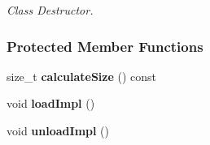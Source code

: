 \begin{DoxyCompactItemize}
\begin{DoxyCompactList}\small\item\em Class Destructor. \item\end{DoxyCompactList}\end{DoxyCompactItemize}
\subsubsection*{Protected Member Functions}
\begin{DoxyCompactItemize}
\item 
\hypertarget{classphys_1_1internal_1_1BulletFile_a6567c5755bfb2fa29f4f4c88ee3240d0}{
size\_\-t {\bfseries calculateSize} () const }
\label{classphys_1_1internal_1_1BulletFile_a6567c5755bfb2fa29f4f4c88ee3240d0}

\item 
\hypertarget{classphys_1_1internal_1_1BulletFile_ab0568f82e14f6e35e1c9c236ec569fdf}{
void {\bfseries loadImpl} ()}
\label{classphys_1_1internal_1_1BulletFile_ab0568f82e14f6e35e1c9c236ec569fdf}

\item 
\hypertarget{classphys_1_1internal_1_1BulletFile_a3baf3dfd3bba2f3ed88cccae00b74596}{
void {\bfseries unloadImpl} ()}
\label{classphys_1_1internal_1_1BulletFile_a3baf3dfd3bba2f3ed88cccae00b74596}

\end{DoxyCompactItemize}
